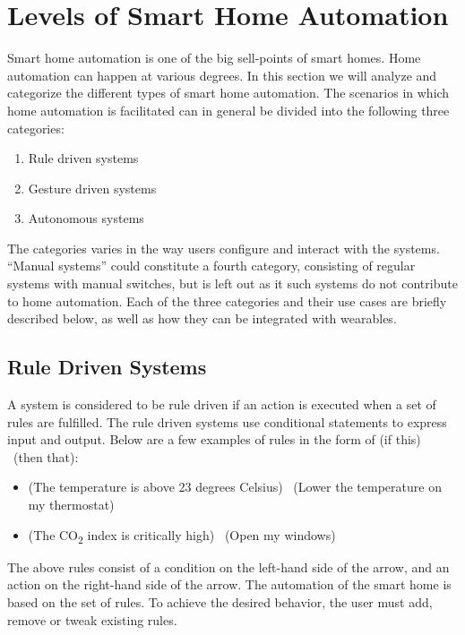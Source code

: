 \section{Levels of Smart Home Automation}\label{sec:system-categories}
Smart home automation is one of the big sell-points of smart homes.
Home automation can happen at various degrees. 
In this section we will analyze and categorize the different types of smart home automation. 
The scenarios in which home automation is facilitated can in general be divided into the following three categories:

\begin{enumerate}
    \item Rule driven systems
    \item Gesture driven systems
    \item Autonomous systems
\end{enumerate}

The categories varies in the way users configure and interact with the systems. 
``Manual systems'' could constitute a fourth category, consisting of regular systems with manual switches,
but is left out as it such systems do not contribute to home automation.
Each of the three categories and their use cases are briefly described below,
as well as how they can be integrated with wearables.

\subsection{Rule Driven Systems}

A system is considered to be rule driven if an action is executed when a set of rules are fulfilled. 
The rule driven systems use conditional statements to express input and output. 
Below are a few examples of rules in the form of (if this) \textrightarrow~(then that):

\begin{itemize}
    \item (The temperature is above 23 degrees Celsius) \textrightarrow~(Lower the temperature on my thermostat)
    \item (The CO\textsubscript{2} index is critically high) \textrightarrow~(Open my windows)
\end{itemize}

The above rules consist of a condition on the left-hand side of the arrow, 
and an action on the right-hand side of the arrow.
The automation of the smart home is based on the set of rules. 
To achieve the desired behavior, the user must add, remove or tweak existing rules.

